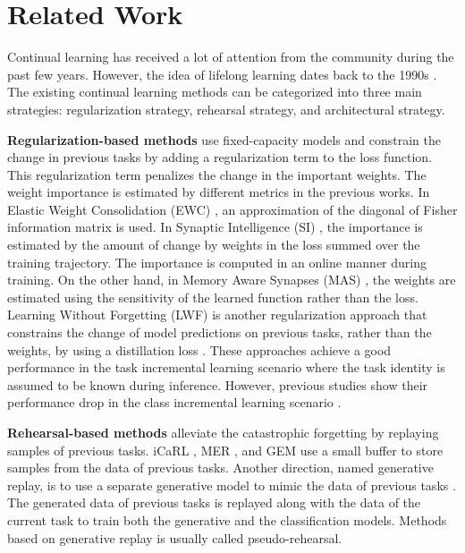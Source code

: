 \documentclass[letterpaper]{article} %
\begin{document}
\section{Related Work}
Continual learning has received a lot of attention from the community during the past few years. However, the idea of lifelong learning dates back to the 1990s \cite{thrun1998lifelong,thrun1995lifelong}. The existing continual learning methods can be categorized into three main strategies: regularization strategy, rehearsal strategy, and architectural strategy.

\textbf{Regularization-based methods} use fixed-capacity models and constrain the change in previous tasks by adding a regularization term to the loss function. This regularization term penalizes the change in the important weights. The weight importance is estimated by different metrics in the previous works. In Elastic Weight Consolidation (EWC) \cite{kirkpatrick2017overcoming}, an approximation of the diagonal of Fisher information matrix is used. In Synaptic Intelligence (SI) \cite{zenke2017continual}, the importance is estimated by the amount of change by weights in the loss summed over the training trajectory. The importance is computed in an online manner during training. On the other hand, in Memory Aware Synapses (MAS) \cite{aljundi2018memory}, the weights are estimated using the sensitivity of the learned function rather than the loss. Learning Without Forgetting (LWF) \cite{li2017learning} is another regularization approach that constrains the change of model predictions on previous tasks, rather than the weights, by using a distillation loss \cite{hinton2015distilling}. These approaches achieve a good performance in the task incremental learning scenario where the task identity is assumed to be known during inference. However, previous studies show their performance drop in the class incremental learning scenario \cite{kemker2018measuring,Hsu18_EvalCL,Farquhar2019a,VanDeVen2018a}.

\textbf{Rehearsal-based methods} alleviate the catastrophic forgetting by replaying samples of previous tasks. iCaRL \cite{rebuffi2017icarl}, MER \cite{riemer2018learning}, and GEM \cite{lopez2017gradient} use a small buffer to store samples from the data of previous tasks. Another direction, named generative replay, is to use a separate generative model to mimic the data of previous tasks \cite{shin2017continual,mocanu2016online}. The generated data of previous tasks is replayed along with the data of the current task to train both the generative and the classification models. Methods based on generative replay is usually called pseudo-rehearsal. 
\end{document}
